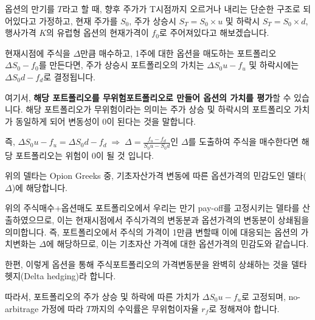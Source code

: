 \documentclass[
  letterpaper,
  DIV=11,
  numbers=noendperiod]{scrreprt}
\begin{document}

옵션의 만기를 \(T\)라고 할 때, 향후 주가가 T시점까지 오르거나 내리는
단순한 구조로 되어있다고 가정하고, 현재 주가를 \(S_0\), 주가 상승시
\(S_T=S_0\times u\) 및 하락시 \(S_T=S_0\times d\), 행사가격 \(K\)의
유럽형 옵션의 현재가격이 \(f_0\)로 주어져있다고 해보겠습니다.

현재시점에 주식을 \(\Delta\)만큼 매수하고, 1주에 대한 옵션을 매도하는
포트폴리오 \(\Delta S_0-f_0\)를 만든다면, 주가 상승시 포트폴리오의
가치는 \(\Delta S_0u-f_u\) 및 하락시에는 \(\Delta S_0d-f_d\)로
결정됩니다.

여기서, \textbf{해당 포트폴리오를 무위험포트폴리오로 만들어 옵션의
가치를 평가}할 수 있습니다. 해당 포트폴리오가 무위험이라는 의미는 주가
상승 및 하락시의 포트폴리오 가치가 동일하게 되어 변동성이 0이 된다는
것을 말합니다.

즉,
\(\Delta S_0u-f_u=\Delta S_0d-f_d\;\Rightarrow\;\Delta=\frac{f_u-f_d}{S_0u-S_0d}\)인
\(\Delta\)를 도출하여 주식을 매수한다면 해당 포트폴리오는 위험이 0이 될
것 입니다.

\begin{tcolorbox}[enhanced jigsaw, toprule=.15mm, breakable, left=2mm, leftrule=.75mm, opacitybacktitle=0.6, coltitle=black, rightrule=.15mm, colback=white, titlerule=0mm, bottomtitle=1mm, colframe=quarto-callout-tip-color-frame, title=\textcolor{quarto-callout-tip-color}{\faLightbulb}\hspace{0.5em}{13.6 Options Delta}, toptitle=1mm, arc=.35mm, colbacktitle=quarto-callout-tip-color!10!white, opacityback=0, bottomrule=.15mm]

위의 델타는 Opion Greeks 중, 기초자산가격 변동에 따른 옵션가격의
민감도인 델타(\(\Delta\))에 해당합니다.

위의 주식매수+옵션매도 포트폴리오에서 우리는 만기 pay-off를 고정시키는
델타를 산출하였으므로, 이는 현재시점에서 주식가격의 변동분과 옵션가격의
변동분이 상쇄됨을 의미합니다. 즉, 포트폴리오에서 주식의 가격이 1만큼
변할때 이에 대응되는 옵션의 가치변화는 \(\Delta\)에 해당하므로, 이는
기초자산 가격에 대한 옵션가격의 민감도와 같습니다.

한편, 이렇게 옵션을 통해 주식포트폴리오의 가격변동분을 완벽히 상쇄하는
것을 델타헷지(Delta hedging)라 합니다.

\end{tcolorbox}

따라서, 포트폴리오의 주가 상승 및 하락에 따른 가치가
\(\Delta S_0u-f_u\)로 고정되며, no-arbitrage 가정에 따라 \(T\)까지의
수익률은 무위험이자율 \(r_f\)로 정해져야 합니다.
\end{document}
